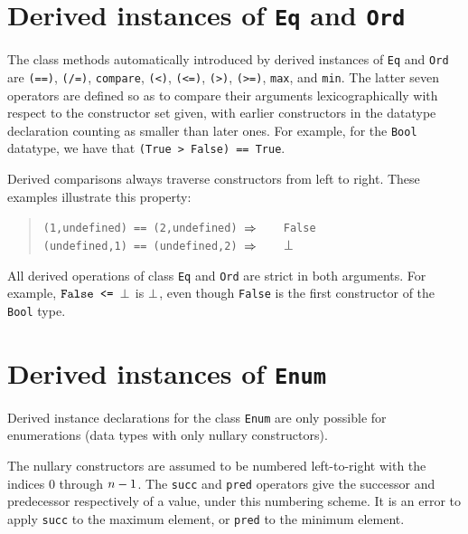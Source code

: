 \section{Derived instances of \texorpdfstring{\mbox{\tt Eq}}{Eq} and \texorpdfstring{\mbox{\tt Ord}}{Ord}}
The class methods automatically introduced by derived instances
of \mbox{\tt Eq} and \mbox{\tt Ord} are \mbox{\tt (==)},
\indextt{==}
\mbox{\tt (/=)},
\indextt{/=}
\mbox{\tt compare},
\mbox{\tt (<)},
\indextt{<}
\mbox{\tt (<=)},
\indextt{<=}
\mbox{\tt (>)},
\indextt{>}
\mbox{\tt (>=)},
\indextt{>=}
\mbox{\tt max}, and 
\mbox{\tt min}.  The latter seven operators are defined so
as to compare their arguments lexicographically with respect to
the constructor set given, with earlier constructors in the datatype
declaration counting as smaller than later ones.  For example, for the
\mbox{\tt Bool} datatype, we have that \mbox{\tt (True\ >\ False)\ ==\ True}.

Derived comparisons always traverse constructors from left to right.
These examples illustrate this property:
\begin{quote}
\mbox{\tt (1,undefined)\ ==\ (2,undefined)\ }\mbox{$\it \Rightarrow$}\mbox{\tt \ \ \ \ False}\\
\mbox{\tt (undefined,1)\ ==\ (undefined,2)\ }\mbox{$\it \Rightarrow$}\mbox{\tt \ \ \ \ }\mbox{$\it \bot$}
\end{quote}
All derived operations of class \mbox{\tt Eq} and \mbox{\tt Ord} are strict in both arguments.
For example, \mbox{$\it \makebox{\tt False\ <=\ }\bot$} is \mbox{$\it \bot$}, even though \mbox{\tt False} is the first constructor
of the \mbox{\tt Bool} type.

\section{Derived instances of \texorpdfstring{\mbox{\tt Enum}}{Enum}}
Derived instance declarations for the class \mbox{\tt Enum} are only
possible for enumerations (data types with only nullary constructors).

The nullary constructors are assumed to be
numbered left-to-right with the indices 0 through $n-1\/$.
The \mbox{\tt succ} and \mbox{\tt pred} operators give the successor and predecessor
respectively of a value, under this numbering scheme.  It is
an error to apply \mbox{\tt succ} to the maximum element, or \mbox{\tt pred} to the minimum
element.

